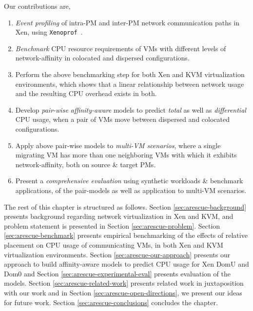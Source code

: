 Our contributions are,
\begin{enumerate}
	\item \emph{Event profiling} of intra-PM and inter-PM network
		    communication paths in Xen, using \texttt{Xenoprof}~\cite{xenoprof}.
\item \emph{Benchmark} CPU resource requirements
of VMs with different levels of network-affinity
in colocated and dispersed configurations.
\item Perform the above benchmarking step for both Xen and KVM virtualization environments,
	which shows that a linear relationship between network usage and the resulting CPU overhead
	exists in both.
\item Develop \emph{pair-wise affinity-aware} models to predict \textit{total}
	as well as \textit{differential} CPU usage, when a pair of VMs move between
dispersed and colocated configurations.
\item Apply above pair-wise models to \emph{multi-VM scenarios}, where
a single migrating VM has more than one neighboring
VMs with which it exhibits network-affinity, both on source \& target PMs.
\item Present a \emph{comprehensive evaluation} using synthetic workloads \& benchmark applications,
	of the pair-models as well as application to multi-VM scenarios.
\end{enumerate}

\noindent The rest of this chapter is structured as follows. Section \ref{sec:arescue-background}
presents background regarding network virtualization in Xen and KVM, and
problem statement is presented in Section \ref{sec:arescue-problem}.
Section \ref{sec:arescue-benchmark}
presents empirical benchmarking of the effects of relative placement on
CPU usage of communicating VMs, in both Xen and KVM virtualization environments.
Section \ref{sec:arescue-our-approach} presents our approach to
build affinity-aware models to predict CPU usage for Xen DomU and Dom0
and Section \ref{sec:arescue-experimental-eval} presents evaluation 
of the models.
Section \ref{sec:arescue-related-work} presents related work in juxtaposition
with our work and 
in Section \ref{sec:arescue-open-directions}, we
present our ideas for future work.
Section \ref{sec:arescue-conclusions} concludes the chapter.

